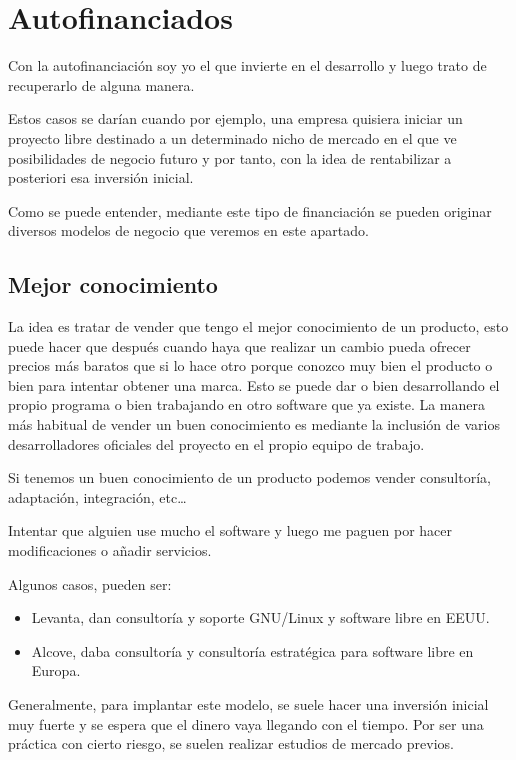 \section{Autofinanciados}

Con la autofinanciación soy yo el que invierte en el desarrollo y luego
trato de recuperarlo de alguna manera.

Estos casos se darían cuando por ejemplo, una empresa quisiera iniciar un
proyecto libre destinado a un determinado nicho de mercado en el que ve
posibilidades de negocio futuro y por tanto, con la idea de rentabilizar a
posteriori esa inversión inicial.

Como se puede entender, mediante este tipo de financiación se pueden originar
diversos modelos de negocio que veremos en este apartado.

\subsection{Mejor conocimiento}

La idea es tratar de vender que tengo el mejor conocimiento de un producto, esto
puede hacer que después cuando haya que realizar un cambio pueda ofrecer precios
más baratos que si lo hace otro porque conozco muy bien el producto o bien para
intentar obtener una marca. Esto se puede dar o bien desarrollando el propio
programa o bien trabajando en otro software que ya existe.
La manera más habitual de vender un buen conocimiento es mediante la
inclusión de varios desarrolladores oficiales del proyecto en el
propio equipo de trabajo.

Si tenemos un buen conocimiento de un producto podemos vender consultoría,
adaptación, integración, etc\ldots

Intentar que alguien use mucho el software y luego me paguen por hacer
modificaciones o añadir servicios.

Algunos casos, pueden ser:
\begin{itemize}
  \item Levanta, dan consultoría y soporte GNU/Linux y software libre en EEUU.
  \item Alcove, daba consultoría y consultoría estratégica para software libre
  en Europa.
\end{itemize}

Generalmente, para implantar este modelo, se suele hacer una inversión
inicial muy fuerte y se espera que el dinero vaya llegando con el
tiempo. Por ser una práctica con cierto riesgo, se suelen realizar
estudios de mercado previos.

